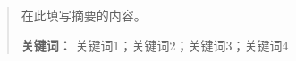 \documentclass[12pt,a4paper,UTF8,fontset=fandol]{ctexart}
\begin{document}
\cover
\thispagestyle{empty} %
\newpage
{} %

\begin{abstract}\normalsize   %

在此填写摘要的内容。

\noindent \textbf{关键词：}
关键词1；关键词2；关键词3；关键词4

\end{abstract}
\newpage
\begin{center}
    \tableofcontents
\end{center}
\newpage
{} %




\newpage
{}
{}   %
\end{document}
